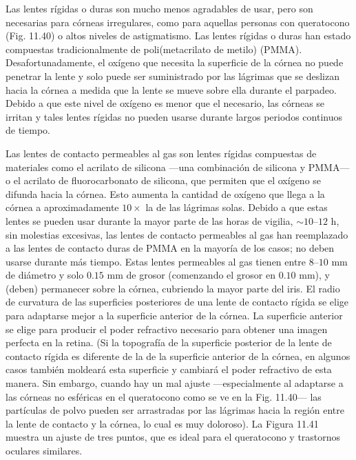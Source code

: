 \documentclass[12pt]{book}
\begin{document}
Las lentes rígidas o duras son mucho menos agradables de usar, pero son necesarias para córneas irregulares, como para aquellas personas con queratocono (Fig. 11.40) o altos niveles de astigmatismo. Las lentes rígidas o duras han estado compuestas tradicionalmente de poli(metacrilato de metilo) (PMMA). Desafortunadamente, el oxígeno que necesita la superficie de la córnea no puede penetrar la lente y solo puede ser suministrado por las lágrimas que se deslizan hacia la córnea a medida que la lente se mueve sobre ella durante el parpadeo. Debido a que este nivel de oxígeno es menor que el necesario, las córneas se irritan y tales lentes rígidas no pueden usarse durante largos periodos continuos de tiempo.

Las lentes de contacto permeables al gas son lentes rígidas compuestas de materiales como el acrilato de silicona ---una combinación de silicona y PMMA--- o el acrilato de fluorocarbonato de silicona, que permiten que el oxígeno se difunda hacia la córnea. Esto aumenta la cantidad de oxígeno que llega a la córnea a aproximadamente $10\times$ la de las lágrimas solas. Debido a que estas lentes se pueden usar durante la mayor parte de las horas de vigilia, $\sim 10\text{--}12\text{ h}$, sin molestias excesivas, las lentes de contacto permeables al gas han reemplazado a las lentes de contacto duras de PMMA en la mayoría de los casos; no deben usarse durante más tiempo. Estas lentes permeables al gas tienen entre $8\text{--}10\text{ mm}$ de diámetro y solo $0.15\text{ mm}$ de grosor (comenzando el grosor en $0.10\text{ mm}$), y (deben) permanecer sobre la córnea, cubriendo la mayor parte del iris. El radio de curvatura de las superficies posteriores de una lente de contacto rígida se elige para adaptarse mejor a la superficie anterior de la córnea. La superficie anterior se elige para producir el poder refractivo necesario para obtener una imagen perfecta en la retina. (Si la topografía de la superficie posterior de la lente de contacto rígida es diferente de la de la superficie anterior de la córnea, en algunos casos también moldeará esta superficie y cambiará el poder refractivo de esta manera. Sin embargo, cuando hay un mal ajuste ---especialmente al adaptarse a las córneas no esféricas en el queratocono como se ve en la Fig. 11.40--- las partículas de polvo pueden ser arrastradas por las lágrimas hacia la región entre la lente de contacto y la córnea, lo cual es muy doloroso). La Figura 11.41 muestra un ajuste de tres puntos, que es ideal para el queratocono y trastornos oculares similares.
\end{document}
